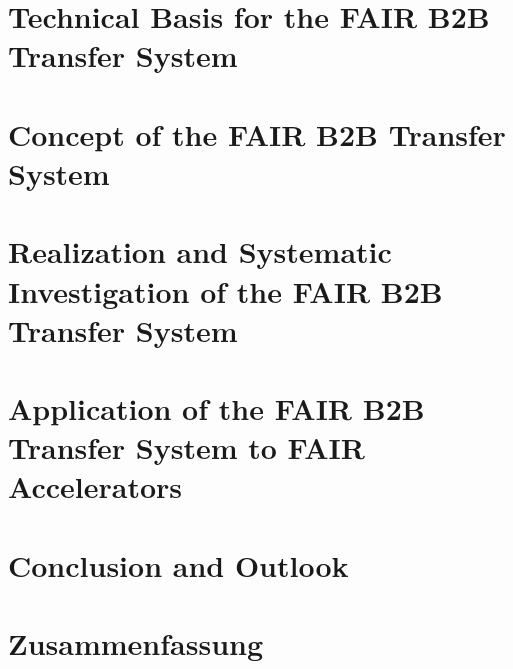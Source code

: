 \documentclass[12pt,twoside]{report}
\renewcommand{\_}{%
  \textunderscore\hspace{0pt}%
}
\begin{document}
\chapter{Technical Basis for the FAIR B2B Transfer System}\label{technical}

\chapter{Concept of the FAIR B2B Transfer System}\label{concept}

\chapter{Realization and Systematic Investigation of the FAIR B2B Transfer System}\label{realization}

\chapter{Application of the FAIR B2B Transfer System to FAIR Accelerators}\label{application}

%
\setcounter{table}{0}
\renewcommand{\thetable}{\Roman{table}}
\chapter*{Conclusion and Outlook}



\setcounter{table}{0}
\renewcommand{\thetable}{\Roman{table}}
\renewcommand{\tablename}{Tabelle}
\chapter*{Zusammenfassung}

%
\end{document}
